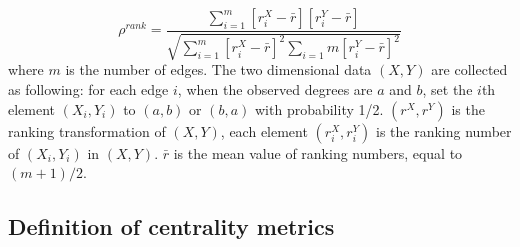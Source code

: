 \documentclass[symmetry,article,submit,moreauthors,pdftex,10pt,a4paper]{Definitions/mdpi}
\begin{document}
\begin{enumerate}
\begin{equation}
\label{eq:ac2}
\rho^{rank}=\frac{\sum_{i=1}^{m}[r_i^X-\bar{r}][r_i^Y-\bar{r}]}{\sqrt{\sum_{i=1}^{m}[r_i^X-\bar{r}]^2\sum_{i=1}{m}[r_i^Y-\bar{r}]^2}}
\end{equation}
where $m$ is the number of edges. The two dimensional data $(X,Y)$ are collected as following: for each edge $i$, when the observed degrees are $a$ and $b$, set the $i$th element $(X_i, Y_i)$ to $(a,b)$ or $(b,a)$ with probability 1/2. $(r^X, r^Y)$ is the ranking transformation of $(X,Y)$, each element $(r_i^X, r_i^Y)$ is the ranking number of $(X_i, Y_i)$ in $(X,Y)$.  $\bar{r}$ is the mean value of ranking numbers, equal to $(m+1)/2$.
\end{enumerate}


\subsection{Definition of centrality metrics}
\label{sec:2.1}
\end{document}
